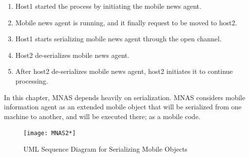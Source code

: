 \documentclass[12pt,a4paper,final,twoside,onecolumn,titlepage]{book}
\begin{document}
\begin{enumerate}
\item Host1 started the process by initiating the mobile news agent.
\item Mobile news agent is running, and it finally request to be moved to host2.
\item Host1 starts serializing mobile news agent through the open channel.
\item Host2 de-serializes mobile news agent.
\item After host2 de-serializes mobile news agent, host2 initiates it to continue processing.
\end{enumerate}
In this chapter, \gls{MNAS} depends heavily on serialization. \gls{MNAS} considers mobile information agent as an extended mobile object that will be serialized from one machine to another, and will be executed there; as a mobile code.
\begin{figure}
\begin{center}
\texttt{[image: MNAS2*]}
\end{center}\caption{UML Sequence Diagram for Serializing Mobile Objects}
\label{MNAS2}
\end{figure}
\end{document}
